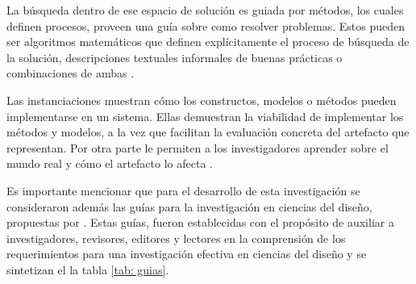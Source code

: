 La búsqueda dentro de ese espacio de solución es guiada por métodos, los cuales definen procesos, proveen una guía sobre como resolver problemas. Estos pueden ser algoritmos matemáticos que definen explícitamente el proceso de búsqueda de la solución, descripciones textuales informales de buenas prácticas o combinaciones de ambas \citep{Hevner:2004:DSI:2017212.2017217}.  

Las instanciaciones muestran cómo los constructos, modelos o métodos pueden implementarse en un sistema. Ellas demuestran la viabilidad de implementar los métodos y modelos, a la vez que facilitan la evaluación concreta del artefacto que representan. Por otra parte le permiten a los investigadores aprender sobre el mundo real y cómo el artefacto lo afecta \citep{Hevner:2004:DSI:2017212.2017217}.

Es importante mencionar que para el desarrollo de esta investigación se consideraron además las guías para la investigación en ciencias del diseño, propuestas por \cite{Hevner:2004:DSI:2017212.2017217}. Estas guías, fueron establecidas con el propósito de auxiliar a investigadores, revisores, editores y lectores en la comprensión de los requerimientos para una investigación efectiva en ciencias del diseño y se sintetizan el la tabla \ref{tab: guias}.

